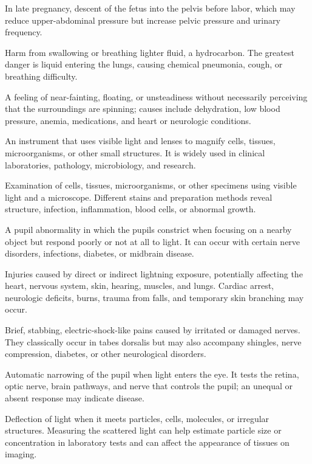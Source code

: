  In late pregnancy, descent of the fetus into the pelvis before labor, which may reduce upper-abdominal pressure but increase pelvic pressure and urinary frequency.

 Harm from swallowing or breathing lighter fluid, a hydrocarbon. The greatest danger is liquid entering the lungs, causing chemical pneumonia, cough, or breathing difficulty.

 A feeling of near-fainting, floating, or unsteadiness without necessarily perceiving that the surroundings are spinning; causes include dehydration, low blood pressure, anemia, medications, and heart or neurologic conditions.

 An instrument that uses visible light and lenses to magnify cells, tissues, microorganisms, or other small structures. It is widely used in clinical laboratories, pathology, microbiology, and research.

 Examination of cells, tissues, microorganisms, or other specimens using visible light and a microscope. Different stains and preparation methods reveal structure, infection, inflammation, blood cells, or abnormal growth.

 A pupil abnormality in which the pupils constrict when focusing on a nearby object but respond poorly or not at all to light. It can occur with certain nerve disorders, infections, diabetes, or midbrain disease.

 Injuries caused by direct or indirect lightning exposure, potentially affecting the heart, nervous system, skin, hearing, muscles, and lungs. Cardiac arrest, neurologic deficits, burns, trauma from falls, and temporary skin branching may occur.

 Brief, stabbing, electric-shock-like pains caused by irritated or damaged nerves. They classically occur in tabes dorsalis but may also accompany shingles, nerve compression, diabetes, or other neurological disorders.

 Automatic narrowing of the pupil when light enters the eye. It tests the retina, optic nerve, brain pathways, and nerve that controls the pupil; an unequal or absent response may indicate disease.

 Deflection of light when it meets particles, cells, molecules, or irregular structures. Measuring the scattered light can help estimate particle size or concentration in laboratory tests and can affect the appearance of tissues on imaging.

